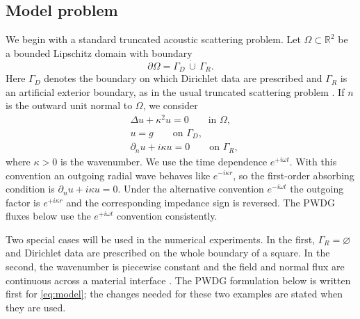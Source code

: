 \documentclass[pdflatex,sn-mathphys-num]{sn-jnl}
\theoremstyle{thmstyleone}
\theoremstyle{thmstyletwo}
\begin{document}
\subsection{Model problem}
We begin with a standard truncated acoustic scattering problem.  Let $\Omega\subset\mathbb R^2$ be a bounded Lipschitz domain with boundary
\[
 \partial\Omega=\Gamma_D\,\dot\cup\,\Gamma_R.
\]
Here $\Gamma_D$ denotes the boundary on which Dirichlet data are prescribed and $\Gamma_R$ is an artificial exterior boundary, as in the usual truncated scattering problem \cite{CessenatDespres1998,HiptmairMoiolaPerugiaSurvey2016}.  If $n$ is the outward unit normal to $\Omega$, we consider
\begin{equation}\label{eq:model}
 \begin{aligned}
  &\Delta u+\kappa^2u=0 \qquad \text{in }\Omega,\\
  &u=g \qquad \text{on }\Gamma_D,\\
  &\partial_nu+i\kappa u=0 \qquad \text{on }\Gamma_R,
 \end{aligned}
\end{equation}
where $\kappa>0$ is the wavenumber.  We use the time dependence $e^{+i\omega t}$.  With this convention an outgoing radial wave behaves like $e^{-i\kappa r}$, so the first-order absorbing condition is $\partial_nu+i\kappa u=0$.  Under the alternative convention $e^{-i\omega t}$ the outgoing factor is $e^{+i\kappa r}$ and the corresponding impedance sign is reversed.  The PWDG fluxes below use the $e^{+i\omega t}$ convention consistently.

Two special cases will be used in the numerical experiments.  In the first, $\Gamma_R=\varnothing$ and Dirichlet data are prescribed on the whole boundary of a square.  In the second, the wavenumber is piecewise constant and the field and normal flux are continuous across a material interface \cite{MoiolaSpence2019}.  The PWDG formulation below is written first for \eqref{eq:model}; the changes needed for these two examples are stated when they are used.
\end{document}
